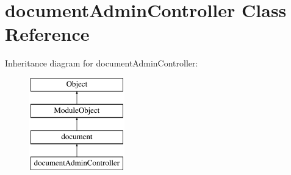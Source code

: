 \hypertarget{classdocumentAdminController}{}\section{document\+Admin\+Controller Class Reference}
\label{classdocumentAdminController}
Inheritance diagram for document\+Admin\+Controller\+:\begin{figure}[H]
\begin{center}
\leavevmode
\includegraphics[height=4.000000cm]{classdocumentAdminController}
\end{center}
\end{figure}
